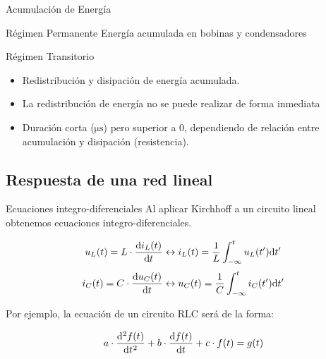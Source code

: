 \documentclass[aspectratio=169, usenames,svgnames,dvipsnames]{beamer}
\begin{document}
\begin{frame}[label={sec:org4b72540}]{Acumulación de Energía}
\begin{block}{Régimen Permanente}
\alert{Energía acumulada} en \alert{bobinas} y \alert{condensadores}
\end{block}
\begin{block}{Régimen Transitorio}
\begin{itemize}
\item \alert{Redistribución} y \alert{disipación} de energía acumulada.
\item La redistribución de energía \alert{no} se puede realizar de forma \alert{inmediata}
\item \alert{Duración corta} (\(\si{\micro\second}\)) pero superior a 0, dependiendo de \alert{relación entre acumulación y disipación} (resistencia).
\end{itemize}
\end{block}
\end{frame}

\subsection{Respuesta de una red lineal}
\label{sec:org1e5a736}

\begin{frame}[label={sec:org09673ce}]{Ecuaciones integro-diferenciales}
Al aplicar Kirchhoff a un circuito lineal obtenemos ecuaciones integro-diferenciales. 

\[
  u_L(t) = L \cdot \diff{i_L(t)}{t}
  \leftrightarrow
  i_L(t) = \frac{1}{L} \int^t_{-\infty}u_L(t') \mathrm{d}t'
\]
\[
  i_C(t) = C \cdot \diff{u_C(t)}{t}
  \leftrightarrow
  u_C(t) = \frac{1}{C} \int^t_{-\infty}i_C(t') \mathrm{d}t'
\]

Por ejemplo, la ecuación de un circuito RLC será de la forma:

\[
  a \cdot \diff[2]{f(t)}{t} + b \cdot \diff{f(t)}{t} + c \cdot f(t) = g(t)
\]
\end{frame}
\end{document}
